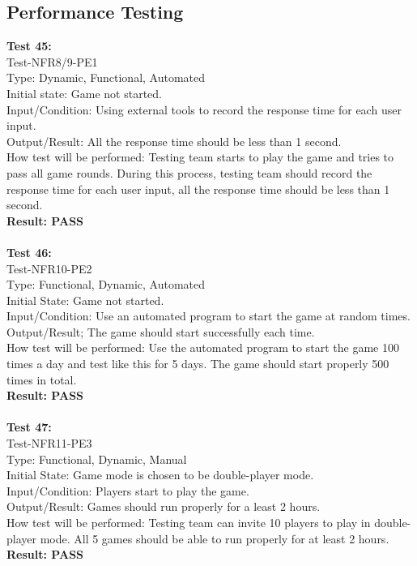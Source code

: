 \documentclass[12pt, titlepage]{article}
\begin{document}
\subsection{Performance Testing}
\textbf{Test 45:}\\
Test-NFR8/9-PE1\\
Type: Dynamic, Functional, Automated\\
Initial state: Game not started.\\
Input/Condition: Using external tools to record
 the response time for each user input.\\
Output/Result: All the response time should be 
less than 1 second.\\
How test will be performed: Testing team starts to play
the game and tries to pass all game rounds. During this
process, testing team should record the response time 
for each user input, all the response time should be 
less than 1 second.\\
\textbf{Result: PASS}\\\\
\textbf{Test 46:}\\
Test-NFR10-PE2\\
Type: Functional, Dynamic, Automated\\
Initial State: Game not started.\\
Input/Condition: Use an automated program to start the
game at random times.\\
Output/Result; The game should start successfully 
each time.\\
How test will be performed: Use the automated program
to start the game 100 times a day and test like this 
for 5 days. The game should start properly 500 times in 
total.\\
\textbf{Result: PASS}\\\\
\textbf{Test 47:}\\
Test-NFR11-PE3\\
Type: Functional, Dynamic, Manual\\
Initial State: Game mode is chosen to be double-player
mode.\\
Input/Condition: Players start to play the game.\\
Output/Result: Games should run properly for a least 
2 hours.\\
How test will be performed: Testing team can invite 
10 players to play in double-player mode. All 5 games
should be able to run properly for at least 2 hours.\\
\textbf{Result: PASS}\\\\
\end{document}
